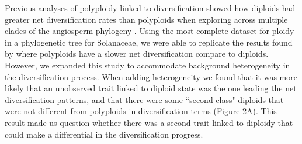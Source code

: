 Previous analyses of polyploidy linked to diversification showed how diploids had greater net diversification rates than polyploids when exploring across multiple clades of the angiosperm phylogeny \citet{mayrose_2011, mayrose_2015}. 
Using the most complete dataset for ploidy in a phylogenetic tree for Solanaceae, we were able to replicate the results found by \citet{mayrose_2011} where polyploids have a slower net diversification compare to diploids.
However, we expanded this study to accommodate  background heterogeneity in the diversification process.
When adding heterogeneity we found that it was more likely that an unobserved trait linked to diploid state was the one leading the net diversification patterns, and that there were some ``second-class"  diploids that were not different from  polyploids  in diversification terms (Figure 2A).
This result made us question whether there was a second trait linked to diploidy that could make a differential in the diversification progress.

